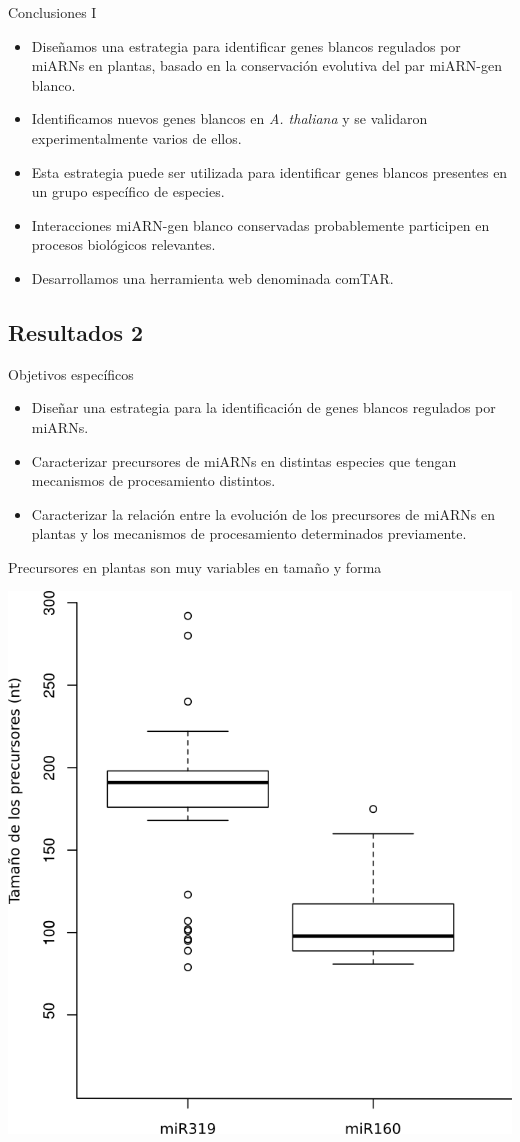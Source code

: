 \documentclass{beamer}
\begin{document}
\begin{frame}{Conclusiones I}
	\begin{itemize}
        \item<1-> Diseñamos una estrategia para identificar genes blancos regulados por miARNs en plantas, basado en la conservación evolutiva del par miARN-gen blanco.
        \item<1-> Identificamos nuevos genes blancos en \textit{A. thaliana} y se validaron experimentalmente varios de ellos.
        \item<1-> Esta estrategia puede ser utilizada para identificar genes blancos presentes en un grupo específico de especies.
        \item<2-> Interacciones miARN-gen blanco conservadas probablemente participen en procesos biológicos relevantes.
        \item<3-> Desarrollamos una herramienta web denominada comTAR.
	\end{itemize}
\end{frame}

\subsection{Resultados 2}

\begin{frame}{Objetivos específicos}
		\pause
		\begin{itemize}
            \item<-1> Diseñar una estrategia para la identificación de genes blancos regulados por miARNs.
			\item<-2> Caracterizar precursores de miARNs en distintas especies que tengan mecanismos de procesamiento distintos.
			\item<-1> Caracterizar la relación entre la evolución de los precursores de miARNs en plantas y los mecanismos de procesamiento determinados previamente.
        \end{itemize}
\end{frame}


\begin{frame}{Precursores en plantas son muy variables en tamaño y forma}
	\begin{center}
		\includegraphics[width=.5\textwidth]{img/hairpin_distribution.png}
	\end{center}
\end{frame}
\end{document}
